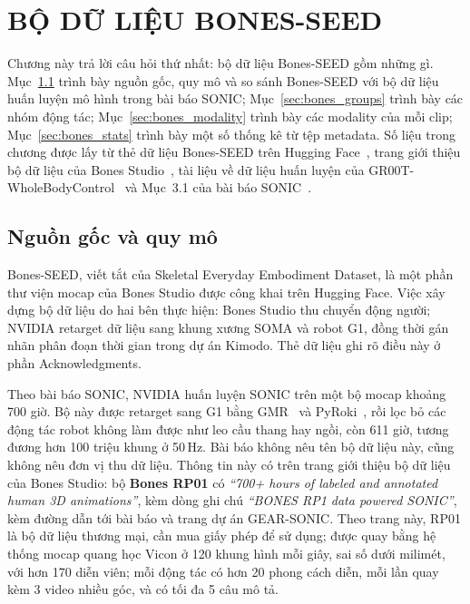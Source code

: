 \documentclass[12pt,a4paper,oneside]{report}
\begin{document}
\chapter{BỘ DỮ LIỆU BONES-SEED}
\label{chap:bones}
Chương này trả lời câu hỏi thứ nhất: bộ dữ liệu Bones-SEED gồm những gì. Mục~\ref{sec:bones_origin} trình bày nguồn gốc, quy mô và so sánh Bones-SEED với bộ dữ liệu huấn luyện mô hình trong bài báo SONIC; Mục~\ref{sec:bones_groups} trình bày các nhóm động tác; Mục~\ref{sec:bones_modality} trình bày các modality của mỗi clip; Mục~\ref{sec:bones_stats} trình bày một số thống kê từ tệp metadata. Số liệu trong chương được lấy từ thẻ dữ liệu Bones-SEED trên Hugging Face~\cite{bonesseed}, trang giới thiệu bộ dữ liệu của Bones Studio~\cite{bonesweb}, tài liệu về dữ liệu huấn luyện của GR00T-WholeBodyControl~\cite{wbc} và Mục~3.1 của bài báo SONIC~\cite{sonic}.

\section{Nguồn gốc và quy mô}
\label{sec:bones_origin}

Bones-SEED, viết tắt của Skeletal Everyday Embodiment Dataset, là một phần thư viện mocap của Bones Studio được công khai trên Hugging Face. Việc xây dựng bộ dữ liệu do hai bên thực hiện: Bones Studio thu chuyển động người; NVIDIA retarget dữ liệu sang khung xương SOMA và robot G1, đồng thời gán nhãn phân đoạn thời gian trong dự án Kimodo. Thẻ dữ liệu ghi rõ điều này ở phần Acknowledgments.

Theo bài báo SONIC, NVIDIA huấn luyện SONIC trên một bộ mocap khoảng 700 giờ. Bộ này được retarget sang G1 bằng GMR~\cite{gmr} và PyRoki~\cite{pyroki}, rồi lọc bỏ các động tác robot không làm được như leo cầu thang hay ngồi, còn 611 giờ, tương đương hơn 100 triệu khung ở 50\,Hz. Bài báo không nêu tên bộ dữ liệu này, cũng không nêu đơn vị thu dữ liệu. Thông tin này có trên trang giới thiệu bộ dữ liệu của Bones Studio: bộ \textbf{Bones RP01} có \emph{``700+ hours of labeled and annotated human 3D animations''}, kèm dòng ghi chú \emph{``BONES RP1 data powered SONIC''}, kèm đường dẫn tới bài báo và trang dự án GEAR-SONIC. Theo trang này, RP01 là bộ dữ liệu thương mại, cần mua giấy phép để sử dụng; được quay bằng hệ thống mocap quang học Vicon ở 120 khung hình mỗi giây, sai số dưới milimét, với hơn 170 diễn viên; mỗi động tác có hơn 20 phong cách diễn, mỗi lần quay kèm 3 video nhiều góc, và có tối đa 5 câu mô tả.
\end{document}
